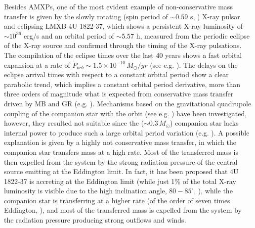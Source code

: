 \documentclass[graybox]{svmult}
\begin{document}
Besides AMXPs, one of the most evident example of non-conservative mass transfer is given by the slowly rotating (spin period of $\sim 0.59$ s, \cite{Jonker2001}) X-ray pulsar and eclipsing LMXB 4U 1822-37, which shows a persistent X-ray luminosity of $\sim 10^{36}$ erg/s and an orbital period of $\sim 5.57$ h, measured from the periodic eclipse of the X-ray source and confirmed through the timing of the X-ray pulsations. The compilation of the eclipse times over the last 40 years shows a fast orbital expansion at a rate of $\dot P_{orb} \sim 1.5 \times 10^{-10}\, M_\odot/yr$ (see e.g. \cite{Chou2016,Mazzola2019}). The delays on the eclipse arrival times with respect to a constant orbital period show a clear parabolic trend, which implies a constant orbital period derivative, more than three orders of magnitude what is expected from conservative mass transfer driven by MB and GR (e.g. \cite{Burderi2010,Iaria2011}). Mechanisms based on the gravitational quadrupole coupling of the companion star with the orbit (see e.g. \cite{Applegate1992,Applegate1994}) have been investigated, however, they resulted not suitable since the ($\sim 0.3\, M_\odot$) companion star lacks internal power to produce such a large orbital period variation (e.g. \cite{Mazzola2019}). 
%
A possible explanation is given by a highly not conservative mass transfer, in which the companion star transfers mass at a high rate. Most of the transferred mass is then expelled from the system by the strong radiation pressure of the central source emitting at the Eddington limit. In fact, it has been proposed that 4U 1822-37 is accreting at the Eddington limit (while just 1\% of the total X-ray luminosity is visible due to the high inclination angle, $80-85^\circ$, \cite{Iaria2011}), while the companion star is transferring at a higher rate (of the order of seven times Eddington, \cite{Burderi2010}), and most of the transferred mass is expelled from the system by the radiation pressure producing strong outflows and winds. 
\end{document}
